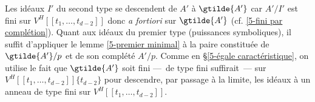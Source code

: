 \documentclass[10pt]{../fichiers-configuration-latex/smfart}
\begin{document}
\subsubsection{}Les idéaux $I'$ du second type se descendent de $A'$ à $\gtilde{A'}$
car $A'/I'$ est fini sur $V^H[[t_1,\dots,t_{d-2}]]$ donc \emph{a
fortiori} sur $\gtilde{A'}$ (cf. \ref{5-fini par complétion}).
Quant aux idéaux du premier type (puissances symboliques), il suffit d'appliquer
le lemme \ref{5-premier minimal} à la paire constituée de $\gtilde{A'}/p$ et de
son complété $A'/p$.
Comme en §\ref{5-égale caractéristique}, on utilise le fait que
$\gtilde{A'}$ soit fini — de type fini suffirait — sur $V^H[[t_1,\dots,t_{d-2}]]\{t_{d-2}\}$ pour
descendre, par passage à la limite, les idéaux à un anneau
de type fini sur $V^H[[t_1,\dots,t_{d-2}]]$.

\ifx\danslelivre\undefined


\end{document}
